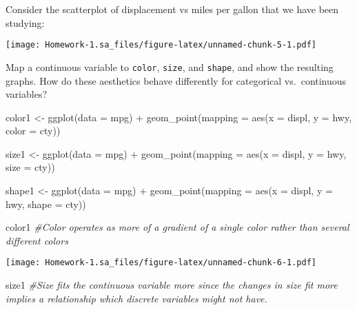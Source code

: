 \documentclass[
]{article}
\newenvironment{Shaded}{\begin{snugshade}}{\end{snugshade}}
\newcommand{\AttributeTok}[1]{\textcolor[rgb]{0.77,0.63,0.00}{#1}}
\newcommand{\CommentTok}[1]{\textcolor[rgb]{0.56,0.35,0.01}{\textit{#1}}}
\newcommand{\FunctionTok}[1]{\textcolor[rgb]{0.00,0.00,0.00}{#1}}
\newcommand{\NormalTok}[1]{#1}
\newcommand{\OtherTok}[1]{\textcolor[rgb]{0.56,0.35,0.01}{#1}}
\newcommand{\SpecialCharTok}[1]{\textcolor[rgb]{0.00,0.00,0.00}{#1}}
\begin{document}
Consider the scatterplot of displacement vs miles per gallon that we
have been studying:

\texttt{[image: Homework-1.sa\_files/figure-latex/unnamed-chunk-5-1.pdf]}

Map a continuous variable to \texttt{color}, \texttt{size}, and
\texttt{shape}, and show the resulting graphs. How do these aesthetics
behave differently for categorical vs.~continuous variables?

\begin{Shaded}
\begin{Highlighting}[]
\NormalTok{color1 }\OtherTok{\textless{}{-}} \FunctionTok{ggplot}\NormalTok{(}\AttributeTok{data =}\NormalTok{ mpg) }\SpecialCharTok{+}
  \FunctionTok{geom\_point}\NormalTok{(}\AttributeTok{mapping =} \FunctionTok{aes}\NormalTok{(}\AttributeTok{x =}\NormalTok{ displ, }\AttributeTok{y =}\NormalTok{ hwy, }\AttributeTok{color =}\NormalTok{ cty))}

\NormalTok{size1 }\OtherTok{\textless{}{-}} \FunctionTok{ggplot}\NormalTok{(}\AttributeTok{data =}\NormalTok{ mpg) }\SpecialCharTok{+}
  \FunctionTok{geom\_point}\NormalTok{(}\AttributeTok{mapping =} \FunctionTok{aes}\NormalTok{(}\AttributeTok{x =}\NormalTok{ displ, }\AttributeTok{y =}\NormalTok{ hwy, }\AttributeTok{size =}\NormalTok{ cty))}

\NormalTok{shape1 }\OtherTok{\textless{}{-}} \FunctionTok{ggplot}\NormalTok{(}\AttributeTok{data =}\NormalTok{ mpg) }\SpecialCharTok{+}
  \FunctionTok{geom\_point}\NormalTok{(}\AttributeTok{mapping =} \FunctionTok{aes}\NormalTok{(}\AttributeTok{x =}\NormalTok{ displ, }\AttributeTok{y =}\NormalTok{ hwy, }\AttributeTok{shape =}\NormalTok{ cty))}


\NormalTok{color1 }\CommentTok{\#Color operates as more of a gradient of a single color rather than several              different colors}
\end{Highlighting}
\end{Shaded}

\texttt{[image: Homework-1.sa\_files/figure-latex/unnamed-chunk-6-1.pdf]}

\begin{Shaded}
\begin{Highlighting}[]
\NormalTok{size1  }\CommentTok{\#Size fits the continuous variable more since the changes in size fit more               implies a relationship which discrete variables might not have.}
\end{Highlighting}
\end{Shaded}
\end{document}
